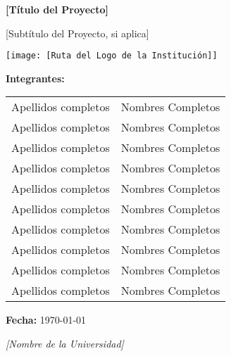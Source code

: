 \begin{titlepage}
    \centering
    \vspace*{1.5cm}

    {\LARGE\bfseries [Título del Proyecto] \par}
    \vspace{0.5cm}
    {\large [Subtítulo del Proyecto, si aplica] \par}

    \vspace{0.8cm}
    \texttt{[image: [Ruta del Logo de la Institución]]}
    \vspace{0.5cm}

    \vfill

    {\normalsize \textbf{Integrantes:} \par}
    \vspace{0.3cm}
    \begin{minipage}{0.7\textwidth}
    \centering
    \begin{tabular}{ll}
        Apellidos completos & Nombres Completos \\
        Apellidos completos & Nombres Completos \\
        Apellidos completos & Nombres Completos \\
        Apellidos completos & Nombres Completos \\
        Apellidos completos & Nombres Completos \\
        Apellidos completos & Nombres Completos \\
        Apellidos completos & Nombres Completos \\
        Apellidos completos & Nombres Completos \\
        Apellidos completos & Nombres Completos \\
        Apellidos completos & Nombres Completos \\
    \end{tabular}
    \end{minipage}

    \vspace{1cm}
    {\normalsize \textbf{Fecha:} \today \par}
    \vspace{1cm}

    \vfill

    {\small\textit{[Nombre de la Universidad] \\ [Nombre de la Facultad o Departamento] \\ [Nombre de la Cátedra o Asignatura]}}
\end{titlepage}